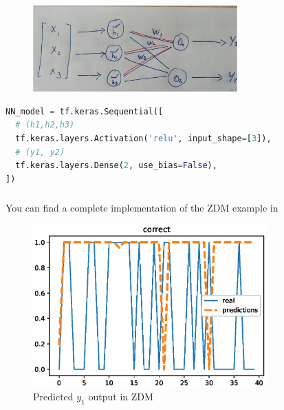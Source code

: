 \documentclass{beamer}
\begin{document}
\begin{frame}[fragile]
    \frametitle{\insertsection}
    \begin{figure}
        \centering
        \includegraphics[width=0.7\textwidth]{img/nn-relu.jpg}
        \caption{}
        \label{fig:nn-relu2}
    \end{figure}

        \begin{lstlisting}[language=Python]
NN_model = tf.keras.Sequential([
  # (h1,h2,h3)
  tf.keras.layers.Activation('relu', input_shape=[3]),
  # (y1, y2)
  tf.keras.layers.Dense(2, use_bias=False),  
])\end{lstlisting}

\end{frame}


\begin{frame}
    \frametitle{\insertsection}
    You can find a complete implementation of the ZDM example in \href{https://github.com/MartinPJorge/nn-intro-slides/blob/master/zdm.ipynb}{}
    \vfill
    \begin{figure}
        \centering
        \includegraphics[width=0.8\textwidth]{img/correct.eps}
        \caption{Predicted $y_1$ output in ZDM}
        \label{fig:nn-relu2}
    \end{figure}
\end{frame}
\end{document}
